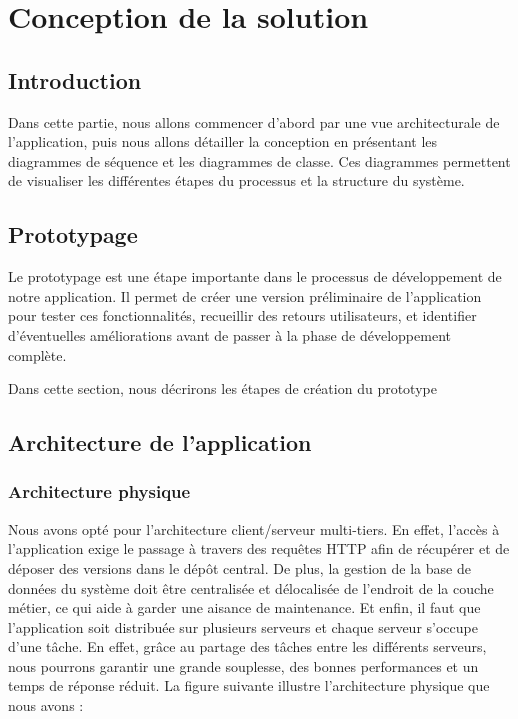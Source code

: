 \chapter{Conception de la solution}
\label{Conception de la solution}

\section*{Introduction}

Dans cette partie, nous allons commencer d’abord par une vue architecturale de
l’application, puis nous allons détailler la conception en présentant les
diagrammes de séquence et les diagrammes de classe. Ces diagrammes permettent de visualiser les différentes étapes du processus et la structure du système.

\pagebreak
\section{Prototypage}

Le prototypage est une étape importante dans le processus de développement de notre application. Il permet de créer une version préliminaire de
 l'application pour tester ces fonctionnalités, recueillir des retours utilisateurs, et identifier d'éventuelles améliorations avant de passer à la phase de développement complète.

 Dans cette section, nous décrirons les étapes de création du prototype
\section{Architecture de l’application}

\subsection{Architecture physique}

Nous avons opté pour l’architecture client/serveur multi-tiers. En effet, l’accès à l’application exige le passage à
travers des requêtes HTTP afin de récupérer et de déposer des versions dans le dépôt
central. De plus, la gestion de la base de données du système doit être centralisée et délocalisée de l’endroit de la couche métier, ce qui aide à garder une aisance de maintenance.
Et enfin, il faut que l’application soit distribuée sur plusieurs serveurs et chaque serveur
s’occupe d’une tâche. En effet, grâce au partage des tâches entre les différents serveurs,
nous pourrons garantir une grande souplesse, des bonnes performances et un temps de
réponse réduit. La figure suivante illustre l’architecture physique que nous avons :

